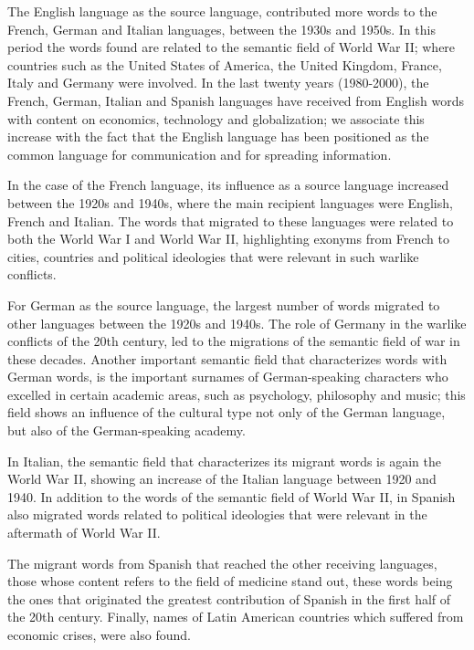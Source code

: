 \documentclass[10pt,letterpaper]{article} %
\begin{document}
The English language as the source language, contributed more words to the French, German and Italian languages, between the 1930s and 1950s. In this period the words found are related to the semantic field of World War II; where countries such as the United States of America, the United Kingdom, France, Italy and Germany were involved. In the last twenty years (1980-2000), the French, German, Italian and Spanish languages ​have received from English words with content on economics, technology and globalization; we associate this increase with the fact that the English language has been positioned as the common language for communication and for spreading information.

In the case of the French language, its influence as a source language increased between the 1920s and 1940s, where the main recipient languages were English, French and Italian. The words that migrated to these languages ​were related to both the World War I and World War II, highlighting exonyms from French to cities, countries and political ideologies that were relevant in such warlike conflicts.

For German as the source language, the largest number of words migrated to other languages ​​between the 1920s and 1940s. The role of Germany in the warlike conflicts of the 20th century, led to the migrations of the semantic field of war in these decades. Another important semantic field that characterizes words with German words, is the important surnames of German-speaking characters who excelled in certain academic areas, such as psychology, philosophy and music; this field shows an influence of the cultural type not only of the German language, but also of the German-speaking academy.

In Italian, the semantic field that characterizes its migrant words  is again the World War II, showing an increase of the Italian language between 1920 and 1940. In addition to the words of the semantic field of World War II, in Spanish also migrated words related to political ideologies that were relevant in the aftermath of World War II.


The migrant words from Spanish that reached the other receiving languages, those whose content refers to the field of medicine stand out, these words being the ones that originated the greatest contribution of Spanish in the first half of the 20th century. Finally, names of Latin American countries  which suffered from economic crises, were also found.
\end{document}
